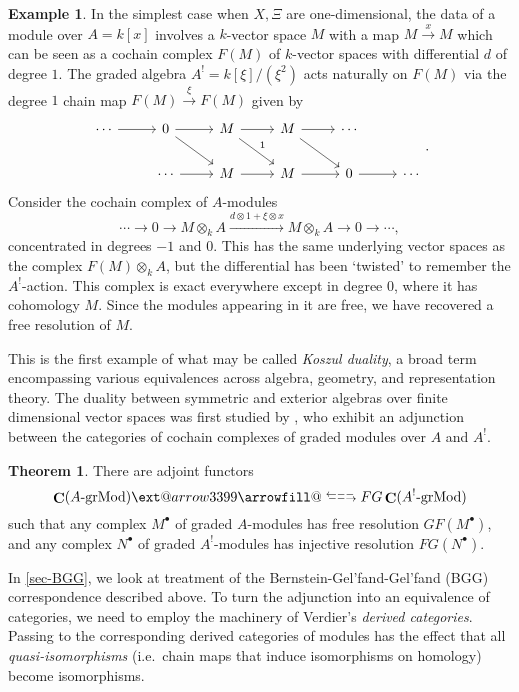 \documentclass[a4paper]{article}
\makeatletter
\theoremstyle{definition}
\newtheorem*{theorem*}{Theorem}
\newtheorem{example}[defn]{Example}
\theoremstyle{remark}
\newcommand{\leftrarrows}{\mathrel{\raise.75ex\hbox{\oalign{%
  $\scriptstyle\leftarrow$\cr
  \vrule width0pt height.5ex$\hfil\scriptstyle\relbar$\cr}}}}
\newcommand{\lrightarrows}{\mathrel{\raise.75ex\hbox{\oalign{%
  $\scriptstyle\relbar$\hfil\cr
  $\scriptstyle\vrule width0pt height.5ex\smash\rightarrow$\cr}}}}
\newcommand{\Rrelbar}{\mathrel{\raise.75ex\hbox{\oalign{%
  $\scriptstyle\relbar$\cr
  \vrule width0pt height.5ex$\scriptstyle\relbar$}}}}
\def\leftrightarrowsfill@{\arrowfill@\leftrarrows\Rrelbar\lrightarrows}
\newcommand{\xleftrightarrows}[2][]{\ext@arrow 3399\leftrightarrowsfill@{#1}{#2}}
\newcommand{\grMod}{\ensuremath{\text{-grMod}}}
\DeclareMathOperator{\Ch}{\mathbf{C}}
\makeatother
\begin{document}
\begin{example}\label{setstage}
In the simplest case when \(X, \Xi\) are one-dimensional, the data of a module
over \(A = k[x]\) involves a \(k\)-vector space \(M\) with a map
\(M\xrightarrow{x} M\) which can be seen as a cochain complex \(F(M)\) of
\(k\)-vector spaces with differential \(d\) of degree \(1\). The graded algebra
\(A^! = k[\xi]/(\xi^2)\) acts naturally on \(F(M)\) via the degree \(1\)
chain map \(F(M)\xrightarrow{\xi} F(M)\) given by
\[\begin{tikzcd}
    \cdots \arrow[r] & 0 \arrow[r] \arrow[rd] & M \arrow[r] \arrow[rd, "1"] & M
    \arrow[r] \arrow[rd] & \cdots &   \\ & \cdots \arrow[r] & M \arrow[r] & M
    \arrow[r] & 0 \arrow[r] & \cdots
\end{tikzcd}.\]
Consider the cochain complex of \(A\)-modules
\[\cdots \rightarrow 0 \rightarrow M\otimes_k A
\xrightarrow{ d\otimes 1 + \xi \otimes x} M\otimes_k A \rightarrow 0 \rightarrow
\cdots ,\]
concentrated in degrees \(-1\) and \(0\). This has the same underlying vector
spaces as the complex \(F(M)\otimes_k A\), but the differential has been
`twisted' to remember the \(A^!\)-action. This complex is exact everywhere
except in degree \(0\), where it has cohomology \(M\). Since the modules
appearing in it are free, we have recovered a free resolution of \(M\). 
\end{example}

This is the first example of what may be called \textit{Koszul duality}, a broad
term encompassing various equivalences across algebra, geometry, and representation
theory. The duality between symmetric and exterior algebras over finite
dimensional vector spaces was first studied by
, who exhibit an adjunction between the
categories of cochain complexes of graded modules over \(A\) and \(A^!\).  
\begin{theorem*}
    There are adjoint functors
    \[ \Ch(A\grMod) \xleftrightarrows[F]{G} \Ch(A^!\grMod)\]
    such that any complex \(M^\bullet\) of graded
    \(A\)-modules has free resolution \(GF(M^\bullet)\), and any complex
    \(N^\bullet\) of graded \(A^!\)-modules has injective resolution
    \(FG(N^\bullet)\). 
\end{theorem*}
In \cref{sec-BGG}, we look at 
treatment of the Bernstein-Gel'fand-Gel'fand (BGG) correspondence described
above. To turn the adjunction into an equivalence of categories, we need to
employ the machinery of Verdier's \textit{derived categories}. Passing to the
corresponding derived categories of modules has the effect that all
\textit{quasi-isomorphisms} (i.e.\ chain maps that induce isomorphisms on
homology) become isomorphisms.
\end{document}
